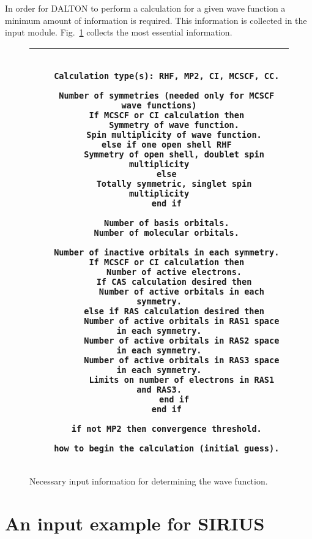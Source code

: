 In order for DALTON to perform a calculation for a given wave function a
minimum amount of
information is required. This information is collected in the
 input module. Fig.~\ref{fig-nec.inp.} collects the most
essential information.

\begin{figure}
    \newlength{\mpwidth}
    \settowidth{\mpwidth}{\tt M}
    \addtolength{\mpwidth}{65\mpwidth}
\begin{tabular}{|c|}
\hline
\begin{minipage}{\mpwidth}
\begin{verbatim}

   Calculation type(s): RHF, MP2, CI, MCSCF, CC.

   Number of symmetries (needed only for MCSCF wave functions)
   If MCSCF or CI calculation then
      Symmetry of wave function.
      Spin multiplicity of wave function.
   else if one open shell RHF
      Symmetry of open shell, doublet spin multiplicity
   else
      Totally symmetric, singlet spin multiplicity
   end if

   Number of basis orbitals.
   Number of molecular orbitals.

   Number of inactive orbitals in each symmetry.
   If MCSCF or CI calculation then
      Number of active electrons.
      If CAS calculation desired then
         Number of active orbitals in each symmetry.
      else if RAS calculation desired then
         Number of active orbitals in RAS1 space in each symmetry.
         Number of active orbitals in RAS2 space in each symmetry.
         Number of active orbitals in RAS3 space in each symmetry.
         Limits on number of electrons in RAS1 and RAS3.
      end if
   end if

   if not MP2 then convergence threshold.

   how to begin the calculation (initial guess).

\end{verbatim}
\end{minipage} \\ \hline
\end{tabular}
\vspace{0.5cm}
\caption{Necessary input information for determining the wave
function.}\label{fig-nec.inp.}
\end{figure}


\section{\label{sec:si-ex} An input example for SIRIUS}

